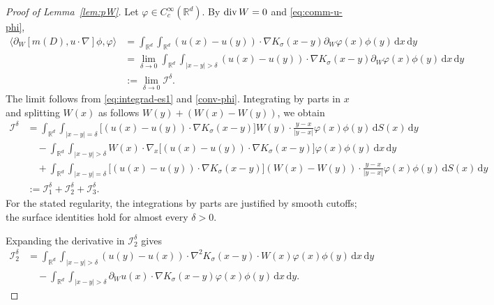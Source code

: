 \documentclass[reqno,11pt,a4paper]{amsart}
\newcommand{\R}{\ensuremath{\mathbb{R}}}
\newcommand{\dd}{\mathrm{d}}
\renewcommand{\div}{{\rm div\,}}
\begin{document}
\begin{proof}[Proof of Lemma~\ref{lem:pW}]
Let $\varphi\in C_c^\infty(\R^d)$.
By $\div W=0$ and \eqref{eq:comm-u-phi},
\begin{align*}
  \bigl\langle
  \partial_W[m(D),u\cdot\nabla]\phi,\varphi
  \bigr\rangle
  &=
  \int_{\R^d}\int_{\R^d}
  (u(x)-u(y))\cdot\nabla K_\sigma(x-y)
  \partial_W\varphi(x)\phi(y)\,\dd x\,\dd y
  \\
  &=
  \lim_{\delta\rightarrow0}
  \int_{\R^d}\int_{|x-y|>\delta}
  (u(x)-u(y))\cdot\nabla K_\sigma(x-y)
  \partial_W\varphi(x)\phi(y)\,\dd x\,\dd y
  \\
  &:=\lim_{\delta\rightarrow0}\mathcal I^\delta.
\end{align*}
The limit follows from \eqref{eq:integrad-es1}
and \eqref{conv-phi}.
Integrating by parts in $x$ and splitting
$W(x)$ as follows $W(y)+(W(x)-W(y))$, we obtain
\begin{align*}
  \mathcal I^\delta
  &=
  \int_{\R^d}\int_{|x-y|=\delta}
  \bigl[(u(x)-u(y))\cdot\nabla K_\sigma(x-y)\bigr]
  W(y)\cdot\frac{y-x}{|y-x|}
  \varphi(x)\phi(y)\,\dd S(x)\,\dd y
  \\
  &\quad-
  \int_{\R^d}\int_{|x-y|>\delta}
  W(x)\cdot\nabla_x
  \bigl[(u(x)-u(y))\cdot\nabla K_\sigma(x-y)\bigr]
  \varphi(x)\phi(y)\,\dd x\,\dd y
  \\
  &\quad+
  \int_{\R^d}\int_{|x-y|=\delta}
  \bigl[(u(x)-u(y))\cdot\nabla K_\sigma(x-y)\bigr]
  (W(x)-W(y))\cdot\frac{y-x}{|y-x|}
  \varphi(x)\phi(y)\,\dd S(x)\,\dd y
  \\
  &:=\mathcal I_1^\delta+\mathcal I_2^\delta
     +\mathcal I_3^\delta.
\end{align*}
For the stated regularity, the integrations by parts
are justified by smooth cutoffs;
the surface identities hold for almost every $\delta>0$.

Expanding the derivative in $\mathcal I_2^\delta$ gives
\begin{align*}
  \mathcal I_2^\delta
  &=
  \int_{\R^d}\int_{|x-y|>\delta}
  (u(y)-u(x))\cdot\nabla^2K_\sigma(x-y)\cdot W(x)
  \varphi(x)\phi(y)\,\dd x\,\dd y
  \\
  &\quad-
  \int_{\R^d}\int_{|x-y|>\delta}
  \partial_Wu(x)\cdot\nabla K_\sigma(x-y)
  \varphi(x)\phi(y)\,\dd x\,\dd y.
\end{align*}


\end{proof}
\end{document}
